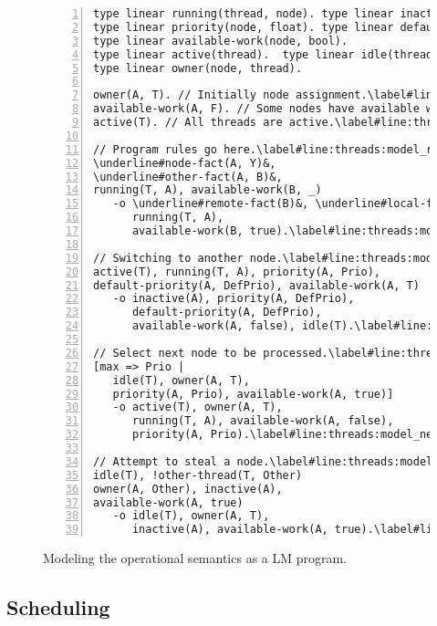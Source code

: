 \begin{figure}[h!]
\begin{Verbatim}[numbers=left,fontsize=\codesize,commandchars=\\\#\&]
type linear running(thread, node). type linear inactive(node).
type linear priority(node, float). type linear default-priority(node, float).
type linear available-work(node, bool).
type linear active(thread).  type linear idle(thread).
type linear owner(node, thread).

owner(A, T). // Initially node assignment.\label#line:threads:model_owner&
available-work(A, F). // Some nodes have available work.\label#line:threads:model_available&
active(T). // All threads are active.\label#line:threads:model_active&

// Program rules go here.\label#line:threads:model_rule1&
\underline#node-fact(A, Y)&,
\underline#other-fact(A, B)&,
running(T, A), available-work(B, _)
   -o \underline#remote-fact(B)&, \underline#local-fact(A)&,
      running(T, A),
      available-work(B, true).\label#line:threads:model_rule2&

// Switching to another node.\label#line:threads:model_drop_node1&
active(T), running(T, A), priority(A, Prio),
default-priority(A, DefPrio), available-work(A, T)
   -o inactive(A), priority(A, DefPrio),
      default-priority(A, DefPrio),
      available-work(A, false), idle(T).\label#line:threads:model_drop_node2&

// Select next node to be processed.\label#line:threads:model_next_node1&
[max => Prio |
   idle(T), owner(A, T),
   priority(A, Prio), available-work(A, true)]
   -o active(T), owner(A, T),
      running(T, A), available-work(A, false),
      priority(A, Prio).\label#line:threads:model_next_node2&

// Attempt to steal a node.\label#line:threads:model_steal1&
idle(T), !other-thread(T, Other)
owner(A, Other), inactive(A),
available-work(A, true)
   -o idle(T), owner(A, T),
      inactive(A), available-work(A, true).\label#line:threads:model_steal2&
\end{Verbatim}
\caption{Modeling the operational semantics as a LM program.}
\label{code:threads:modeling}
\end{figure}


\subsection{Scheduling}


